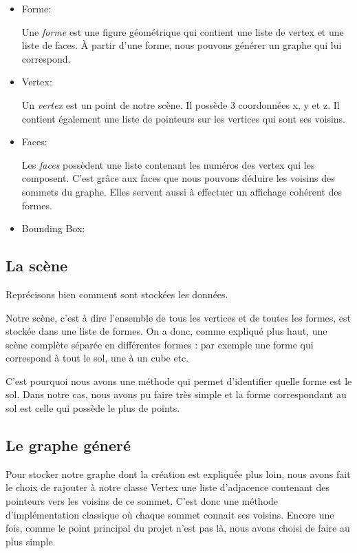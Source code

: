 \documentclass[a4paper,12pt]{report}
\begin{document}
\begin{itemize}
 \item Forme:

Une \textit{forme} est une figure géométrique qui contient une liste de vertex et une liste de faces. À partir d'une forme, nous pouvons générer un graphe qui lui correspond.
 
 \item Vertex:

Un \textit{vertex} est un point de notre scène. Il possède 3 coordonnées x, y et z. Il contient également une liste de pointeurs sur les vertices qui sont ses voisins.

 \item Faces:

Les \textit{faces} possèdent une liste contenant les numéros des vertex qui les composent. C'est grâce aux faces que nous pouvons déduire les voisins des sommets du graphe. Elles servent aussi à effectuer un affichage cohérent des formes.

 \item Bounding Box:

\end{itemize}


\subsection{La scène}

Reprécisons bien comment sont stockées les données.

Notre scène, c'est à dire l'ensemble de tous les vertices et de toutes les formes, est stockée dans une liste de formes. On a donc, comme expliqué plus haut, une scène complète séparée en différentes formes : par exemple une forme qui correspond à tout le sol, une à un cube etc.

C'est pourquoi nous avons une méthode qui permet d'identifier quelle forme est le sol. Dans notre cas, nous avons pu faire très simple et la forme correspondant au sol est celle qui possède le plus de points.

\subsection{Le graphe géneré}

Pour stocker notre graphe dont la création est expliquée plus loin, nous avons fait le choix de rajouter à notre classe Vertex une liste d'adjacence contenant des pointeurs vers les voisins de ce sommet. C'est donc une méthode d'implémentation classique où chaque sommet connait ses voisins. Encore une fois, comme le point principal du projet n'est pas là, nous avons choisi de faire au plus simple. 
\end{document}
